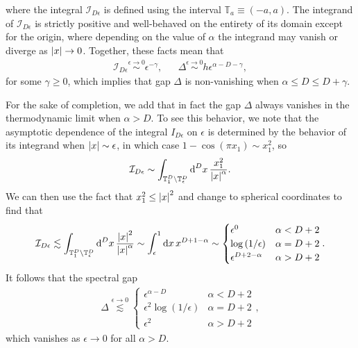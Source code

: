 \documentclass[nofootinbib,notitlepage,11pt]{revtex4-2}
\newcommand{\f}[2]{\dfrac{#1}{#2}} %
\newcommand{\p}[1]{\left(#1\right)} %
\newcommand{\1}{\mathds{1}}
\renewcommand{\d}{\text{d}}
\newcommand{\I}{\mathcal{I}}
\newcommand{\TT}{\mathbb{T}}
\begin{document}
where the integral $\I_{D\epsilon}$ is defined using the interval
$\TT_a\equiv\p{-a,a}$.  The integrand of $\I_{D\epsilon}$ is strictly
positive and well-behaved on the entirety of its domain except for the
origin, where depending on the value of $\alpha$ the integrand may
vanish or diverge as $\abs{x}\to0$.  Together, these facts mean that
\begin{align}
  \I_{D\epsilon} \stackrel{\epsilon\to0}{\sim} \epsilon^{-\gamma},
  &&
  \Delta \stackrel{\epsilon\to0}{\sim} h \epsilon^{\alpha-D-\gamma},
\end{align}
for some $\gamma\ge0$, which implies that gap $\Delta$ is
non-vanishing when $\alpha\le D\le D+\gamma$.

For the sake of completion, we add that in fact the gap $\Delta$
always vanishes in the thermodynamic limit when $\alpha>D$.  To see
this behavior, we note that the asymptotic dependence of the integral
$I_{D\epsilon}$ on $\epsilon$ is determined by the behavior of its
integrand when $\abs{x}\sim\epsilon$, in which case
$1-\cos\p{\pi x_1}\sim x_1^2$, so
\begin{align}
  \I_{D\epsilon}
  \sim \int_{\TT_1^D\setminus\TT_\epsilon^D} \d^Dx\,
  \f{x_1^2}{\abs{x}^\alpha}.
\end{align}
We can then use the fact that $x_1^2\le\abs{x}^2$ and change to
spherical coordinates to find that
\begin{align}
  \I_{D\epsilon} \lesssim
  \int_{\TT_1^D\setminus\TT_\epsilon^D} \d^Dx\,
  \f{\abs{x}^2}{\abs{x}^\alpha}
  \sim \int_\epsilon^1 \d x\, x^{D+1-\alpha}
  \sim
  \begin{cases}
    \epsilon^0 & \alpha < D+2 \\
    \log\p{1/\epsilon} & \alpha = D+2 \\
    \epsilon^{D+2-\alpha} & \alpha > D+2
  \end{cases}.
\end{align}
It follows that the spectral gap
\begin{align}
  \Delta \stackrel{\epsilon\to0}{\lesssim}
  \begin{cases}
    \epsilon^{\alpha-D} & \alpha < D+2 \\
    \epsilon^2 \log\p{1/\epsilon} & \alpha = D + 2 \\
    \epsilon^2 & \alpha > D+2
  \end{cases},
\end{align}
which vanishes as $\epsilon\to0$ for all $\alpha>D$.

\end{document}
